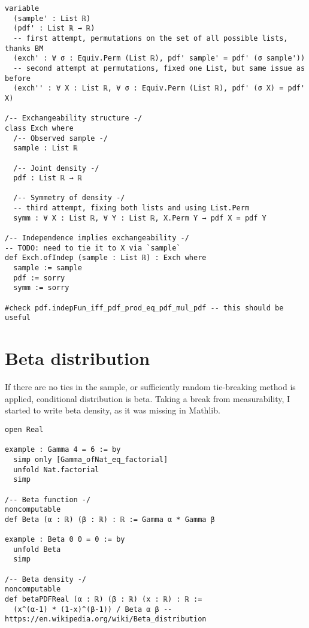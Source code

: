 \documentclass[a4paper, 12pt]{article}
\begin{document}
\begin{lstlisting}
variable
  (sample' : List ℝ)
  (pdf' : List ℝ → ℝ)
  -- first attempt, permutations on the set of all possible lists, thanks BM
  (exch' : ∀ σ : Equiv.Perm (List ℝ), pdf' sample' = pdf' (σ sample'))
  -- second attempt at permutations, fixed one List, but same issue as before
  (exch'' : ∀ X : List ℝ, ∀ σ : Equiv.Perm (List ℝ), pdf' (σ X) = pdf' X)

/-- Exchangeability structure -/
class Exch where
  /-- Observed sample -/
  sample : List ℝ

  /-- Joint density -/
  pdf : List ℝ → ℝ

  /-- Symmetry of density -/
  -- third attempt, fixing both lists and using List.Perm
  symm : ∀ X : List ℝ, ∀ Y : List ℝ, X.Perm Y → pdf X = pdf Y

/-- Independence implies exchangeability -/
-- TODO: need to tie it to X via `sample`
def Exch.ofIndep (sample : List ℝ) : Exch where
  sample := sample
  pdf := sorry
  symm := sorry

#check pdf.indepFun_iff_pdf_prod_eq_pdf_mul_pdf -- this should be useful
\end{lstlisting}



\section*{Beta distribution}

If there are no ties in the sample,
or sufficiently random tie-breaking method is applied,
conditional distribution is beta.
Taking a break from measurability,
I started to write beta density,
as it was missing in Mathlib.

\begin{lstlisting}
open Real

example : Gamma 4 = 6 := by
  simp only [Gamma_ofNat_eq_factorial]
  unfold Nat.factorial
  simp

/-- Beta function -/
noncomputable
def Beta (α : ℝ) (β : ℝ) : ℝ := Gamma α * Gamma β

example : Beta 0 0 = 0 := by
  unfold Beta
  simp

/-- Beta density -/
noncomputable
def betaPDFReal (α : ℝ) (β : ℝ) (x : ℝ) : ℝ :=
  (x^(α-1) * (1-x)^(β-1)) / Beta α β -- https://en.wikipedia.org/wiki/Beta_distribution
\end{lstlisting}


\end{document}
